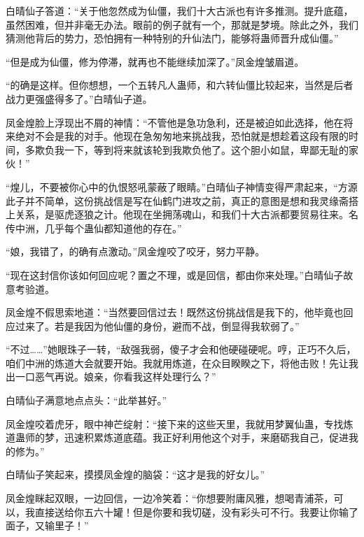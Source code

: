 \begin{this_body}
白晴仙子答道：“关于他忽然成为仙僵，我们十大古派也有许多推测。提升底蕴，虽然困难，但并非毫无办法。眼前的例子就有一个，那就是梦境。除此之外，我们猜测他背后的势力，恐怕拥有一种特别的升仙法门，能够将蛊师晋升成仙僵。”

“但是成为仙僵，修为停滞，就再也不能继续加深了。”凤金煌皱眉道。

“的确是这样。但你想想，一个五转凡人蛊师，和六转仙僵比较起来，当然是后者战力更强盛得多了。”白晴仙子道。

凤金煌脸上浮现出不屑的神情：“不管他是急功急利，还是被迫如此选择，他在将来绝对不会是我的对手。他现在急匆匆地来挑战我，恐怕就是想趁着这段有限的时间，多欺负我一下，等到将来就该轮到我欺负他了。这个胆小如鼠，卑鄙无耻的家伙！”

“煌儿，不要被你心中的仇恨怒吼蒙蔽了眼睛。”白晴仙子神情变得严肃起来，“方源此子并不简单，这份挑战信是写在仙鹤门进攻之前，真正的意图是想和我灵缘斋搭上关系，是驱虎逐狼之计。他现在坐拥荡魂山，和我们十大古派都要贸易往来。名传中洲，几乎每个蛊仙都知道他的存在。”

“娘，我错了，的确有点激动。”凤金煌咬了咬牙，努力平静。

“现在这封信你该如何回应呢？置之不理，或是回信，都由你来处理。”白晴仙子故意考验道。

凤金煌不假思索地道：“当然要回信过去！既然这份挑战信是我下的，他毕竟也回应过来了。若是我因为他仙僵的身份，避而不战，倒显得我软弱了。”

“不过……”她眼珠子一转，“敌强我弱，傻子才会和他硬碰硬呢。哼，正巧不久后，咱们中洲的炼道大会就要开始。我就用炼道，在众目睽睽之下，将他击败！先让我出一口恶气再说。娘亲，你看我这样处理行么？”

白晴仙子满意地点点头：“此举甚好。”

凤金煌咬着虎牙，眼中神芒绽射：“接下来的这些天里，我就用梦翼仙蛊，专找炼道蛊师的梦，迅速积累炼道底蕴。我正好利用他这个对手，来磨砺我自己，促进我的修为。”

白晴仙子笑起来，摸摸凤金煌的脑袋：“这才是我的好女儿。”

凤金煌眯起双眼，一边回信，一边冷笑着：“你想要附庸风雅，想喝青浦茶，可以，我直接送给你五六十罐！但是你要和我切磋，没有彩头可不行。我要让你输了面子，又输里子！”

\end{this_body}

